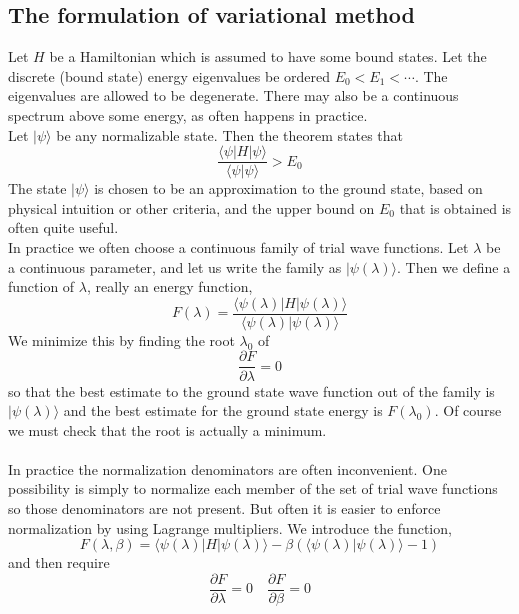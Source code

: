 \documentclass[cyan]{elegantnote}
\begin{document}
\subsection{The formulation of variational method}
Let $H$ be a Hamiltonian which is assumed to have some bound states. Let the discrete (bound state) energy eigenvalues be ordered $E_0 < E_1 < \cdots$. The eigenvalues are allowed to be degenerate. There may also be a continuous spectrum above some energy, as often happens in practice.\\
Let $|\psi\rangle$ be any normalizable state. Then the theorem states that
\[\frac{\langle \psi | H | \psi \rangle}{\langle \psi | \psi \rangle} > E_0\]
The state $|\psi\rangle$ is chosen to be an approximation to the ground state, based on physical intuition or other criteria, and the upper bound on $E_0$ that is obtained is often quite useful. \\
In practice we often choose a continuous family of trial wave functions. Let $\lambda$ be a continuous parameter, and let us write the family as $|\psi(\lambda)\rangle$. Then we define a function of $\lambda$, really an energy function,
\[F(\lambda) = \frac{\langle \psi(\lambda) | H | \psi(\lambda) \rangle}{\langle \psi(\lambda) | \psi(\lambda) \rangle}\]
We minimize this by finding the root $\lambda_0$ of
\[\frac{\partial F}{\partial \lambda} = 0\]
so that the best estimate to the ground state wave function out of the family is $|\psi(\lambda)\rangle$ and the best estimate for the ground state energy is $F(\lambda_0)$. 
Of course we must check that the root is actually a minimum.
\\ \\
In practice the normalization denominators are often inconvenient. One possibility is simply to normalize each member of the set of trial wave functions so those denominators are not
present. 
But often it is easier to enforce normalization by using Lagrange multipliers. We introduce the function,
\[F(\lambda,\beta) = \langle \psi(\lambda) | H | \psi(\lambda) \rangle - \beta (\langle \psi(\lambda) | \psi(\lambda) \rangle - 1)\]
and then require
\[\frac{\partial F}{\partial \lambda} = 0 \quad \frac{\partial F}{\partial \beta} = 0\]
\end{document}
